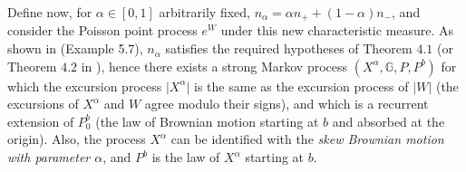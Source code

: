 \documentclass[reqno]{amsart}
\theoremstyle{definition}
\theoremstyle{remark}
\numberwithin{equation}{section}
\begin{document}
Define now, for $\alpha\in[0,1]$ arbitrarily fixed, $n_\alpha=\alpha n_+ + (1-\alpha)n_-$, and consider the Poisson point process $e^W$ under this new characteristic measure. As shown in \cite{Salisbury2} (Example 5.7), $n_\alpha$ satisfies the required hypotheses of Theorem $4.1$ (or Theorem $4.2$ in \cite{Salisbury1}), hence there exists a strong Markov process $(X^\alpha,\mathbb{G},P,P^b)$ for which the excursion process $\vert X^\alpha\vert$ is the same as the excursion process of $\vert W\vert $ (the excursions of $X^\alpha$ and $W$ agree modulo their signs), and which is a recurrent extension of $P_0^b$ (the law of Brownian motion starting at $b$ and absorbed at the origin). Also, the process $X^\alpha$ can be identified with the \emph{skew Brownian motion with parameter $\alpha$}, and $P^b$ is the law of $X^\alpha$ starting at $b$.
\end{document}
